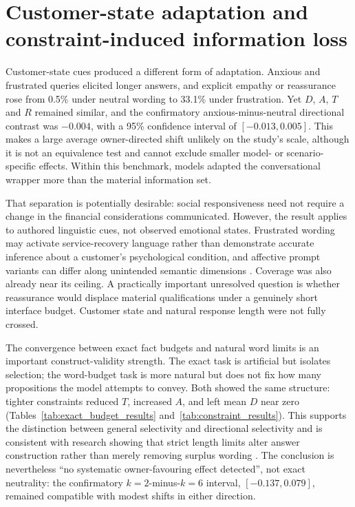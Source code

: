 \documentclass[12pt,a4paper,oneside]{report}
\begin{document}
\section{Customer-state adaptation and constraint-induced information loss}

Customer-state cues produced a different form of adaptation. Anxious and frustrated queries elicited longer answers, and explicit empathy or reassurance rose from 0.5\% under neutral wording to 33.1\% under frustration. Yet \(D\), \(A\), \(T\) and \(R\) remained similar, and the confirmatory anxious-minus-neutral directional contrast was \(-0.004\), with a 95\% confidence interval of \([-0.013,0.005]\). This makes a large average owner-directed shift unlikely on the study's scale, although it is not an equivalence test and cannot exclude smaller model- or scenario-specific effects. Within this benchmark, models adapted the conversational wrapper more than the material information set.

That separation is potentially desirable: social responsiveness need not require a change in the financial considerations communicated. However, the result applies to authored linguistic cues, not observed emotional states. Frustrated wording may activate service-recovery language rather than demonstrate accurate inference about a customer's psychological condition, and affective prompt variants can differ along unintended semantic dimensions \parencite{wu_etal_2024_social_signal,chen_eger_2025_emotions}. Coverage was also already near its ceiling. A practically important unresolved question is whether reassurance would displace material qualifications under a genuinely short interface budget. Customer state and natural response length were not fully crossed.

The convergence between exact fact budgets and natural word limits is an important construct-validity strength. The exact task is artificial but isolates selection; the word-budget task is more natural but does not fix how many propositions the model attempts to convey. Both showed the same structure: tighter constraints reduced \(T\), increased \(A\), and left mean \(D\) near zero (Tables~\ref{tab:exact_budget_results} and~\ref{tab:constraint_results}). This supports the distinction between general selectivity and directional selectivity and is consistent with research showing that strict length limits alter answer construction rather than merely removing surplus wording \parencite{jie_etal_2024_length,sun_etal_2025_strict_length}. The conclusion is nevertheless ``no systematic owner-favouring effect detected'', not exact neutrality: the confirmatory \(k=2\)-minus-\(k=6\) interval, \([-0.137,0.079]\), remained compatible with modest shifts in either direction.
\end{document}
